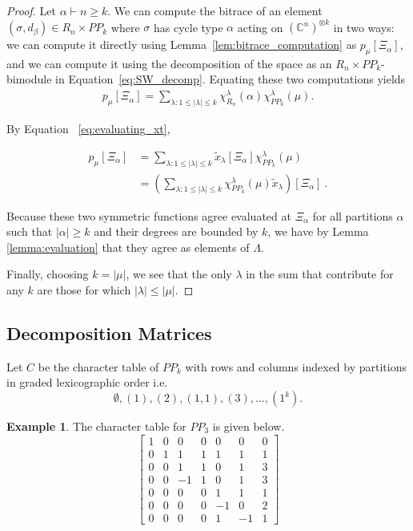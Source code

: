\documentclass{amsart}
\theoremstyle{definition}
\newtheorem{example}[lemma]{Example}
\newcommand{\C}{\mathbb{C}}
\newcommand{\PP}{P\!P}
\begin{document}
\begin{proof}
	Let $\alpha\vdash n\geq k$.
	We can compute the bitrace of an element $(\sigma,d_\beta)\in R_n\times \PP_k$ where $\sigma$ has cycle type $\alpha$ acting on $\left(\C^n\right)^{\otimes k}$ in two ways:
	we can compute it directly using Lemma~\ref{lem:bitrace_computation} as $p_\mu[\Xi_\alpha]$, and we can compute it using the decomposition of the space as an $R_n\times \PP_k$-bimodule in Equation~\eqref{eq:SW_decomp}.
	Equating these two computations yields
	\begin{align*}
		p_\mu[\Xi_\alpha]=\sum_{\lambda:1\leq |\lambda|\leq k} \chi_{R_n}^\lambda(\alpha)\chi_{\PP_k}^\lambda(\mu).
	\end{align*}
	
	By Equation
	~\eqref{eq:evaluating_xt},
	
	\begin{align*}
		p_\mu[\Xi_\alpha]&=\sum_{\lambda:1\leq |\lambda|\leq k} \tilde{x}_\lambda[\Xi_\alpha]\chi_{\PP_k}^\lambda(\mu)\\
				   &=\left(\sum_{\lambda:1\leq |\lambda|\leq k} \chi_{\PP_k}^\lambda(\mu)\tilde{x}_\lambda\right)[\Xi_\alpha]~.
	\end{align*}
	
	Because these two symmetric functions agree evaluated at $\Xi_\alpha$ for all partitions $\alpha$ such that $|\alpha|\geq k$ and their degrees are bounded by $k$, we have by Lemma \ref{lemma:evaluation} that they agree as elements of $\Lambda$.
	
	Finally, choosing $k=|\mu|$, we see that the only $\lambda$ in the sum that contribute for any $k$ are those for which $|\lambda|\leq|\mu|$.
\end{proof}

\subsection{Decomposition Matrices}

Let $C$ be the character table of $\PP_k$ with rows and columns
indexed by partitions in graded lexicographic order i.e.
\[\emptyset, (1), (2), (1,1), (3), \ldots, (1^k).\]

\begin{example}\label{ex:PPk_char_table}
The character table for $\PP_3$ is given below.
\[\left[\begin{array}{rrrrrrr}
1 & 0 & 0 & 0 & 0 & 0 & 0 \\
0 & 1 & 1 & 1 & 1 & 1 & 1 \\
0 & 0 & 1 & 1 & 0 & 1 & 3 \\
0 & 0 & -1 & 1 & 0 & 1 & 3 \\
0 & 0 & 0 & 0 & 1 & 1 & 1 \\
0 & 0 & 0 & 0 & -1 & 0 & 2 \\
0 & 0 & 0 & 0 & 1 & -1 & 1
\end{array}\right]\]
\end{example}
\end{document}
